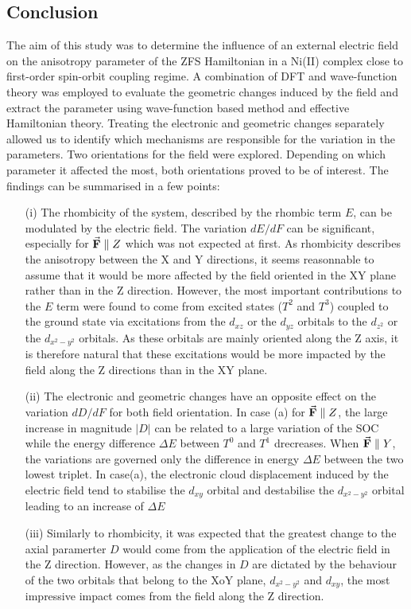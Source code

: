 \documentclass[12pt]{report}
\numberwithin{equation}{section}
\begin{document}
\newpage
\subsection{Conclusion}

The aim of this study was to determine the influence of an external electric field on the anisotropy parameter of the ZFS Hamiltonian in a Ni(II) complex close to first-order spin-orbit coupling regime. 
A combination of DFT and wave-function theory was employed to evaluate the geometric changes induced by the field and extract the parameter using wave-function based method and effective Hamiltonian theory.
Treating the electronic and geometric changes separately allowed us to identify which mechanisms are responsible for the variation in the parameters.
Two orientations for the field were explored. Depending on which parameter it affected the most, both orientations proved to be of interest.
The findings can be summarised in a few points:

\begin{itemize}
    \item[(i)] The rhombicity of the system, described by the rhombic term $E$, can be modulated by the electric field. 
    The variation $dE/dF$ can be significant, especially for $\vec{\vb{F}}\parallel Z$ which was not expected at first.
    As rhombicity describes the anisotropy between the X and Y directions, it seems reasonnable to assume that it would be more affected by the field oriented in the XY plane rather than in the Z direction.
    However, the most important contributions to the $E$ term were found to come from excited states ($T^2$ and $T^3$) coupled to the ground state via excitations from the $d_{xz}$ or the $d_{yz}$ orbitals to the $d_{z^2}$ or the $d_{x^2-y^2}$ orbitals.
    As these orbitals are mainly oriented along the Z axis, it is therefore natural that these excitations would be more impacted by the field along the Z directions than in the XY plane.
    \item[(ii)] The electronic and geometric changes have an opposite effect on the variation $dD/dF$ for both field orientation. 
    In case (a) for $\vec{\vb{F}}\parallel Z$, the large increase in magnitude $|D|$ can be related to a large variation of the SOC while the energy difference $\Delta E$ between $T^0$ and $T^1$ drecreases.
    When $\vec{\vb{F}}\parallel Y$, the variations are governed only the difference in energy $\Delta E$ between the two lowest triplet. 
    In case(a), the electronic cloud displacement induced by the electric field tend to stabilise the $d_{xy}$ orbital and destabilise the $d_{x^2-y^2}$ orbital leading to an increase of $\Delta E$
    \item[(iii)] Similarly to rhombicity, it was expected that the greatest change to the axial paramerter $D$ would come from the application of the electric field in the Z direction.
    However, as the changes in $D$ are dictated by the behaviour of the two orbitals that belong to the XoY plane, $d_{x^2-y^2}$ and $d_{xy}$, the most impressive impact comes from the field along the Z direction.
\end{itemize}
\end{document}
